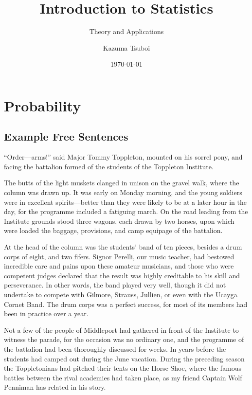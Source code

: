 \documentclass[11pt,a4paper]{book}
\title{Introduction to Statistics}
\subtitle{Theory and Applications}
\author{Kazuma Tsuboi}
\date{\today}
\begin{document}
\maketitle
\tableofcontents

\chapter{Probability}

\section{Example Free Sentences}

“Order—arms!” said Major Tommy Toppleton, mounted on his sorrel pony, and facing the battalion formed of the students of the Toppleton Institute.

The butts of the light muskets clanged in unison on the gravel walk, where the column was drawn up. It was early on Monday morning, and the young soldiers were in excellent spirits—better than they were likely to be at a later hour in the day, for the programme included a fatiguing march. On the road leading from the Institute grounds stood three wagons, each drawn by two horses, upon which were loaded the baggage, provisions, and camp equipage of the battalion.

At the head of the column was the students’ band of ten pieces, besides a drum corps of eight, and two fifers. Signor Perelli, our music teacher, had bestowed incredible care and pains upon these amateur musicians, and those who were competent judges declared that the result was highly creditable to his skill and perseverance. In other words, the band played very well, though it did not undertake to compete with Gilmore, Strauss, Jullien, or even with the Ucayga Cornet Band. The drum corps was a perfect success, for most of its members had been in practice over a year.

Not a few of the people of Middleport had gathered in front of the Institute to witness the parade, for the occasion was no ordinary one, and the programme of the battalion had been thoroughly discussed for weeks. In years before the students had camped out during the June vacation. During the preceding season the Toppletonians had pitched their tents on the Horse Shoe, where the famous battles between the rival academies had taken place, as my friend Captain Wolf Penniman has related in his story.
\end{document}
